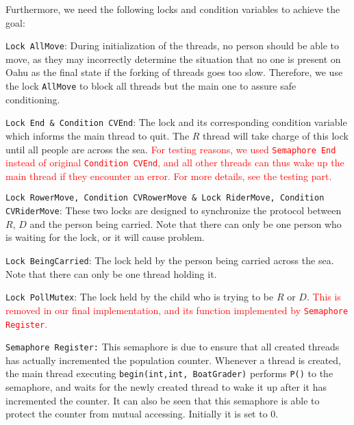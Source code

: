 \documentclass{article}
\begin{document}
\begin{spacing}{1.1}
Furthermore, we need the following locks and condition variables to achieve the goal:\\
\begin{asparaitem}
  \item \texttt{Lock AllMove}: During initialization of the threads, no person should be able to move, as they may incorrectly determine the situation that no one is present on Oahu as the final state if the forking of threads goes too slow. Therefore, we use the lock \texttt{AllMove} to block all threads but the main one to assure safe conditioning.\\
  \item \texttt{Lock End \& Condition CVEnd}: The lock and its corresponding condition variable which informs the main thread to quit. The $R$ thread will take charge of this lock until all people are across the sea. \textcolor{red}{For testing reasons, we used \texttt{Semaphore End} instead of original \texttt{Condition CVEnd}, and all other threads can thus wake up the main thread if they encounter an error. For more details, see the testing part.}\\
  \item \texttt{Lock RowerMove, Condition CVRowerMove \& Lock RiderMove, Condition CVRiderMove}: These two locks are designed to synchronize the protocol between $R$, $D$ and the person being carried. Note that there can only be one person who is waiting for the lock, or it will cause problem.\\
  \item \texttt{Lock BeingCarried}: The lock held by the person being carried across the sea. Note that there can only be one thread holding it.\\
  \item \texttt{Lock PollMutex}: The lock held by the child who is trying to be $R$ or $D$. \textcolor{red}{This is removed in our final implementation, and its function implemented by \texttt{Semaphore Register}.}\\
  \item \texttt{Semaphore Register:} This semaphore is due to ensure that all created threads has actually incremented the population counter. Whenever a thread is created, the main thread executing \texttt{begin(int,int, BoatGrader)} performs \texttt{P()} to the semaphore, and waits for the newly created thread to wake it up after it has incremented the counter. It can also be seen that this semaphore is able to protect the counter from mutual accessing. Initially it is set to 0.\\

\end{asparaitem}
\end{spacing}
\end{document}
